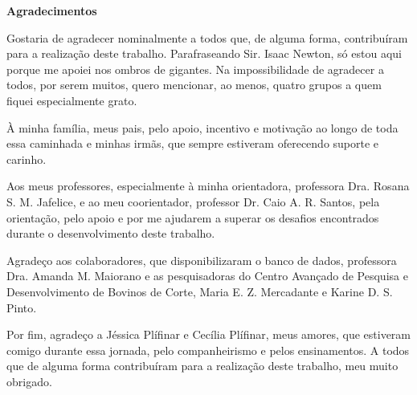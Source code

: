 \begin{center}
		{\LARGE \textbf{Agradecimentos}}
	\end{center}

Gostaria de agradecer nominalmente a todos que, de alguma forma, contribuíram para a realização deste trabalho. Parafraseando Sir. Isaac Newton, só estou aqui porque me apoiei nos ombros de gigantes. Na impossibilidade de agradecer a todos, por serem muitos, quero mencionar, ao menos, quatro grupos a quem fiquei especialmente grato. 

À minha família, meus pais, pelo apoio, incentivo e motivação ao longo de toda essa caminhada e minhas irmãs, que sempre estiveram oferecendo suporte e carinho. 

Aos meus professores, especialmente à minha orientadora, professora Dra. Rosana S. M. Jafelice, e ao meu coorientador, professor Dr. Caio A. R. Santos, pela orientação, pelo apoio e por me ajudarem a superar os desafios encontrados durante o desenvolvimento deste trabalho. 

Agradeço aos colaboradores, que disponibilizaram o banco de dados, professora Dra. Amanda M. Maiorano e as pesquisadoras do Centro Avançado de Pesquisa e Desenvolvimento de Bovinos de Corte, Maria E. Z. Mercadante e Karine D. S. Pinto.


Por fim, agradeço a Jéssica Plífinar e Cecília Plífinar, meus amores, que estiveram comigo durante essa jornada, pelo companheirismo e pelos ensinamentos. A todos que de alguma forma contribuíram para a realização deste trabalho, meu muito obrigado. 

